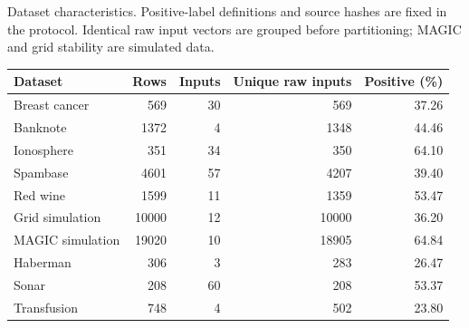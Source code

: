 \begin{kbtable}
\centering
\caption{Dataset characteristics. Positive-label definitions and source hashes are fixed in the protocol. Identical raw input vectors are grouped before partitioning; MAGIC and grid stability are simulated data.}
\label{tab:strength_data}
\small
\begin{adjustbox}{max width=\linewidth}
\begin{tabular}{lrrrr}
\toprule
Dataset & Rows & Inputs & Unique raw inputs & Positive (\%) \\
\midrule
Breast cancer & 569 & 30 & 569 & 37.26 \\
Banknote & 1372 & 4 & 1348 & 44.46 \\
Ionosphere & 351 & 34 & 350 & 64.10 \\
Spambase & 4601 & 57 & 4207 & 39.40 \\
Red wine & 1599 & 11 & 1359 & 53.47 \\
Grid simulation & 10000 & 12 & 10000 & 36.20 \\
MAGIC simulation & 19020 & 10 & 18905 & 64.84 \\
Haberman & 306 & 3 & 283 & 26.47 \\
Sonar & 208 & 60 & 208 & 53.37 \\
Transfusion & 748 & 4 & 502 & 23.80 \\
\bottomrule
\end{tabular}
\end{adjustbox}
\end{kbtable}
